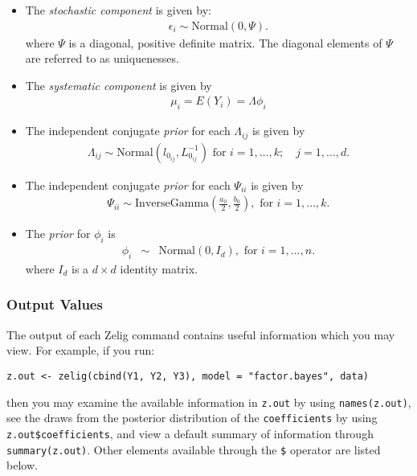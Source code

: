 \begin{itemize}
\item The \emph{stochastic component} is given by:
\begin{eqnarray*}
\epsilon_{i}  \sim \textrm{Normal}(0, \Psi).
\end{eqnarray*}
where $\Psi$ is a diagonal, positive definite matrix. The diagonal elements
of $\Psi$ are referred to as uniquenesses.

\item The \emph{systematic component} is given by
\begin{eqnarray*}
\mu_i = E(Y_i) = \Lambda\phi_i
\end{eqnarray*}

\item The independent conjugate \emph{prior} for each $\Lambda_{ij}$  is given by
\begin{eqnarray*}
\Lambda_{ij} \sim \textrm{Normal}(l_{0_{ij}}, L_{0_{ij}}^{-1})
\textrm{ for } i=1,\ldots, k; \quad j=1,\ldots, d. 
\end{eqnarray*}

\item The independent conjugate \emph{prior} for each $\Psi_{ii}$ is given by
\begin{eqnarray*}
\Psi_{ii} \sim \textrm{InverseGamma}(\frac{a_0}{2}, \frac{b_0}{2}), \textrm{ for } 
i = 1, \ldots, k.
\end{eqnarray*}

\item The \emph{prior} for $\phi_i$ is
\begin{eqnarray*}
\phi_i &\sim& \textrm{Normal}(0, I_d), \textrm{ for } i = 1, \ldots, n.
\end{eqnarray*}
where $I_d$ is a $ d\times d $ identity matrix.
\end{itemize}

\subsubsection{Output Values}

The output of each Zelig command contains useful information which you may
view. For example, if you run:
\begin{verbatim}
z.out <- zelig(cbind(Y1, Y2, Y3), model = "factor.bayes", data)
\end{verbatim}

\noindent then you may examine the available information in \texttt{z.out} by
using \texttt{names(z.out)}, see the draws from the posterior distribution of
the \texttt{coefficients} by using \texttt{z.out\$coefficients}, and view a default
summary of information through \texttt{summary(z.out)}. Other elements
available through the \texttt{\$} operator are listed below.


